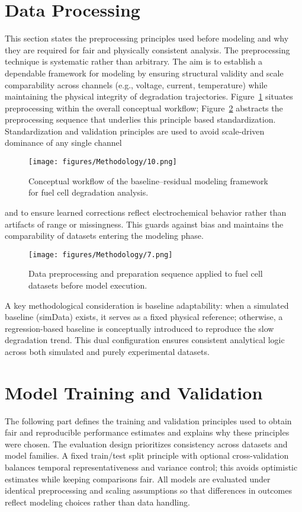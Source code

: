 \section{Data Processing}
\label{sec:data_processing}
This section states the preprocessing principles used before modeling and why they are required for fair and physically consistent analysis. The preprocessing technique is systematic rather than arbitrary.   The aim is to establish a dependable framework for modeling by ensuring structural validity and scale comparability across channels (e.g., voltage, current, temperature) while maintaining the physical integrity of degradation trajectories. Figure~\ref{fig:concept_workflow} situates preprocessing within the overall conceptual workflow;
Figure~\ref{fig:preprocess_sequence} abstracts the preprocessing sequence that underlies this principle based standardization. Standardization and validation principles are used to avoid scale-driven dominance of any single channel
 

\begin{figure}[H]
\centering
 \texttt{[image: figures/Methodology/10.png]}
 \caption[Baseline–residual modeling framework for fuel cell degradation]{Conceptual workflow of the baseline–residual modeling framework for fuel cell degradation analysis.}
 \label{fig:concept_workflow}
\end{figure}

and to ensure learned corrections reflect electrochemical behavior rather than artifacts of range or missingness. This guards against bias and maintains the comparability of datasets entering the modeling phase.
\begin{figure}[H]
\centering
 \texttt{[image: figures/Methodology/7.png]}
 \caption[Data preprocessing pipeline for fuel cell datasets]{Data preprocessing and preparation sequence applied to fuel cell datasets before model execution.}
 \label{fig:preprocess_sequence}
\end{figure}
A key methodological consideration is baseline adaptability: when a simulated baseline (simData) exists, it serves as a fixed physical reference; otherwise, a regression-based baseline is conceptually introduced to reproduce the slow degradation trend. This dual configuration ensures consistent analytical logic across both simulated and purely experimental datasets.

\section{Model Training and Validation}
\label{sec:model_training_validation}
The following part defines the training and validation principles used to obtain fair and reproducible performance estimates and explains why these principles were chosen.
The evaluation design prioritizes consistency across datasets and model families. A fixed train/test split principle with optional cross-validation balances temporal representativeness and variance control; this avoids optimistic estimates while keeping comparisons fair. All models are evaluated under identical preprocessing and scaling assumptions so that differences in outcomes reflect modeling choices rather than data handling.


